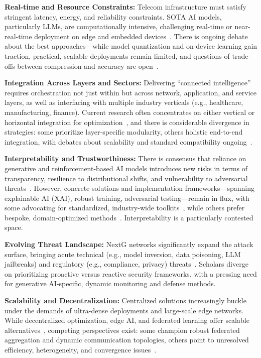 \documentclass[sigconf]{acmart}
\begin{document}
\textbf{Real-time and Resource Constraints:} Telecom infrastructure must satisfy stringent latency, energy, and reliability constraints. SOTA AI models, particularly LLMs, are computationally intensive, challenging real-time or near-real-time deployment on edge and embedded devices~\cite{ref12, ref19, ref22, ref49}. There is ongoing debate about the best approaches—while model quantization and on-device learning gain traction, practical, scalable deployments remain limited, and questions of trade-offs between compression and accuracy are open~\cite{ref19, ref22}.

\textbf{Integration Across Layers and Sectors:} Delivering ``connected intelligence'' requires orchestration not just within but across network, application, and service layers, as well as interfacing with multiple industry verticals (e.g., healthcare, manufacturing, finance). Current research often concentrates on either vertical or horizontal integration for optimization~\cite{ref4, ref5, ref24, ref46}, and there is considerable divergence in strategies: some prioritize layer-specific modularity, others holistic end-to-end integration, with debates about scalability and standard compatibility ongoing~\cite{ref29, ref49}.

\textbf{Interpretability and Trustworthiness:} There is consensus that reliance on generative and reinforcement-based AI models introduces new risks in terms of transparency, resilience to distributional shifts, and vulnerability to adversarial threats~\cite{ref3, ref7, ref18, ref26, ref38}. However, concrete solutions and implementation frameworks—spanning explainable AI (XAI), robust training, adversarial testing—remain in flux, with some advocating for standardized, industry-wide toolkits~\cite{ref7, ref33, ref38}, while others prefer bespoke, domain-optimized methods~\cite{ref18, ref38}. Interpretability is a particularly contested space.

\textbf{Evolving Threat Landscape:} NextG networks significantly expand the attack surface, bringing acute technical (e.g., model inversion, data poisoning, LLM jailbreaks) and regulatory (e.g., compliance, privacy) threats~\cite{ref3, ref15, ref33}. Scholars diverge on prioritizing proactive versus reactive security frameworks, with a pressing need for generative AI-specific, dynamic monitoring and defense methods.

\textbf{Scalability and Decentralization:} Centralized solutions increasingly buckle under the demands of ultra-dense deployments and large-scale edge networks. While decentralized optimization, edge AI, and federated learning offer scalable alternatives~\cite{ref19, ref22, ref23, ref31, ref35, ref49}, competing perspectives exist: some champion robust federated aggregation and dynamic communication topologies, others point to unresolved efficiency, heterogeneity, and convergence issues~\cite{ref23, ref35}.
\end{document}
